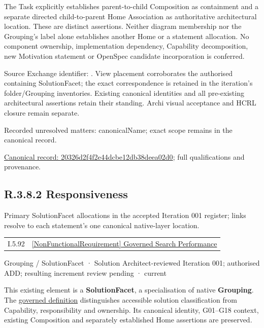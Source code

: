 The Task explicitly establishes parent-to-child Composition as containment and
a separate directed child-to-parent Home Association as authoritative architectural
location. These are distinct assertions. Neither diagram membership nor the
Grouping's label alone establishes another Home or a statement allocation.
No component ownership, implementation dependency, Capability decomposition,
new Motivation statement or OpenSpec candidate incorporation is conferred.



Source Exchange identifier: \texttt{}. View placement corroborates
the authorised containing SolutionFacet; the exact correspondence is retained in the
iteration's folder/Grouping inventories. Existing canonical identities and all
pre-existing architectural assertions retain their standing. Archi visual
acceptance and HCRL closure remain separate.


{\small Recorded unresolved matters: canonicalName; exact scope remains in the canonical record.}\par
{\footnotesize \href{../../../../../../../continuum/grouping/20326d2f4f2e44dcbe12db38deea02d0.md}{Canonical record: 20326d2f4f2e44dcbe12db38deea02d0}; full qualifications and provenance.}\par
\subsection*{R.3.8.2 Responsiveness}
\label{navigation:R.3.8.2}

Primary SolutionFacet allocations in the accepted Iteration 001 register; links resolve to each statement’s one canonical native-layer location.\par
\begin{longtable}{p{.22\linewidth}p{.73\linewidth}}
I.5.92 & \hyperref[element:b29075c844cf403fb1322b4d1aba8803]{[NonFunctionalRequirement] Governed Search Performance} \\
\end{longtable}
\label{element:47d8e097526248349dd6dbbd318b1ef4}
{\small Grouping / SolutionFacet · Solution Architect-reviewed Iteration 001; authorised ADD; resulting increment review pending · current}\par

This existing element is a \textbf{SolutionFacet}, a specialisation of native
\textbf{Grouping}. The \href{\detokenize{../../../../../../../governance/continuum-representation.md#solutionfacet-classification--1119-candidate}}{governed definition}
distinguishes accessible solution classification from Capability, responsibility
and ownership. Its canonical identity, G01–G18 context, existing Composition
and separately established Home assertions are preserved.



